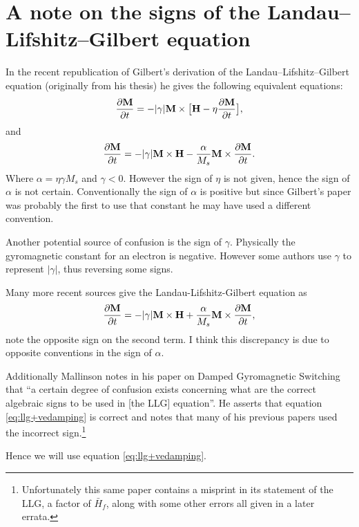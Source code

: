 
\section{A note on the signs of the Landau--Lifshitz--Gilbert equation}
\label{sec:note-signs-llg}

In the recent republication of Gilbert's derivation of the
Landau--Lifshitz--Gilbert equation\cite{Gilbert2004} (originally from his
thesis) he gives the following equivalent equations:
\begin{equation}
  \frac{\partial \mathbf{M}}{\partial t} = - |\gamma| \mathbf{M} \times \big[ \mathbf{H} - \eta \frac{\partial \mathbf{M}}{\partial t} \big],
\end{equation}
and
\begin{equation}
  \frac{\partial \mathbf{M}}{\partial t} = - |\gamma| \mathbf{M} \times \mathbf{H} - \frac{\alpha}{M_s} \mathbf{M} \times \frac{\partial \mathbf{M}}{\partial t}.
  \label{eq:llg-vedamping}
\end{equation}
Where $\alpha = \eta \gamma M_s$ and $\gamma < 0$. However the sign of $\eta$ is not given, hence the sign of $\alpha$ is not certain. Conventionally the sign of $\alpha$ is positive but since Gilbert's paper was probably the first to use that constant he may have used a different convention.

Another potential source of confusion is the sign of $\gamma$. Physically the gyromagnetic constant for an electron is negative. However some authors use $\gamma$ to represent $|\gamma|$, thus reversing some signs.

Many more recent sources\cite{Fidler2000}\cite{nmag-manual}\cite{Lopez-Diaz2012} give the Landau-Lifshitz-Gilbert equation as
\begin{equation}
  \frac{\partial \mathbf{M}}{\partial t} = - |\gamma| \mathbf{M} \times \mathbf{H} + \frac{\alpha}{M_s} \mathbf{M} \times \frac{\partial \mathbf{M}}{\partial t},
  \label{eq:llg+vedamping}
\end{equation}
note the opposite sign on the second term. I think this discrepancy is due to opposite conventions in the sign of $\alpha$.

Additionally Mallinson notes in his paper on Damped Gyromagnetic Switching\cite{Mallinson2000} that ``a certain degree of confusion exists concerning what are the correct algebraic signs to be used in [the LLG] equation''. He asserts that equation \eqref{eq:llg+vedamping} is correct and notes that many of his previous papers used the incorrect sign.\footnote{Unfortunately this same paper contains a misprint in its statement of the LLG, a factor of $\bar{H}_f$, along with some other errors all given in a later errata.}


Hence we will use equation \eqref{eq:llg+vedamping}.




